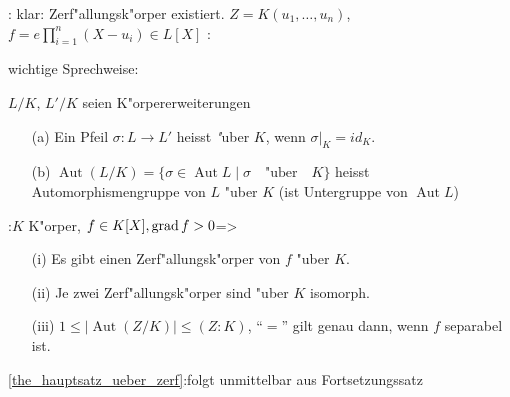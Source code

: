 \remark{}:{	klar: Zerf"allungsk"orper existiert.
 $Z=K(u_1, \ldots, u_n)$, $f=e\prod_{i=1}^{n}(X-u_i)\in L[X]$}
\remark{}:{ 
 wichtige Sprechweise:
	 
 $L/K$, $L'/K$ seien K"orpererweiterungen
 \begin{enumerate}
    \item[(a)] Ein Pfeil $\sigma:L\longrightarrow L'$ heisst {\emph "uber} $K$, wenn $\sigma|_K=id_K$.
	\item[(b)] $\operatorname{Aut}(L/K)=\{\sigma \in \operatorname{Aut}L \mid \sigma \quad \text{"uber} 
	\quad K\}$
	heisst Automorphismengruppe von $L$ "uber $K$ (ist Untergruppe von $\operatorname{Aut} L$)
 \end{enumerate}
}
:{$K$ K"orper, $f\in K[X], \operatorname{grad} f>0$}=>{
 \label{the_hauptsatz_ueber_zerf}
 \begin{enumerate}
    \item[(i)] Es gibt einen Zerf"allungsk"orper von $f$ "uber $K$.
	\item[(ii)] Je zwei Zerf"allungsk"orper sind "uber $K$ isomorph.
	\item[(iii)] $1\leq |\operatorname{Aut}(Z/K)|\leq (Z:K)$, ``$=$'' gilt genau dann, wenn $f$ 
	separabel ist.
 \end{enumerate}}
\proof \ref{the_hauptsatz_ueber_zerf}:{folgt unmittelbar aus Fortsetzungssatz}
	  
  
   
 
